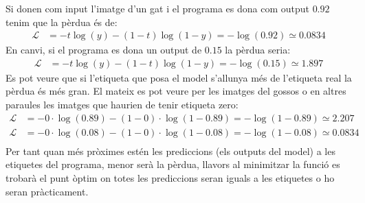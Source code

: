 Si donen com input l'imatge d'un gat i el programa es dona com output $0.92$ tenim que la pèrdua és de:
\begin{align*}
	\mathcal{L} &= - t\log(y) - (1 - t)\log(1 - y) = - \log(0.92) \simeq 0.0834
\end{align*}
En canvi, si el programa es dona un output de $0.15$ la pèrdua seria:
\begin{align*}
	\mathcal{L} &= - t\log(y) - (1 - t)\log(1 - y) = - \log(0.15) \simeq 1.897
\end{align*}
Es pot veure que si l'etiqueta que posa el model s'allunya més de l'etiqueta real la pèrdua és més gran. El mateix es pot veure per les imatges del gossos o en altres paraules les imatges que haurien de tenir etiqueta zero:
\begin{align*}
	\mathcal{L} &= - 0\cdot\log(0.89) - (1 - 0)\cdot\log(1 - 0.89) = - \log(1- 0.89) \simeq 2.207 \\
	\mathcal{L} &= - 0\cdot\log(0.08) - (1 - 0)\cdot\log(1 - 0.08) = - \log(1- 0.08)\simeq 0.0834 \\
\end{align*}
Per tant quan més pròximes estén les prediccions (els outputs del model) a les etiquetes del programa, menor serà la pèrdua, llavors al minimitzar la funció es trobarà el punt òptim on totes les prediccions seran iguals a les etiquetes o ho seran pràcticament. 

